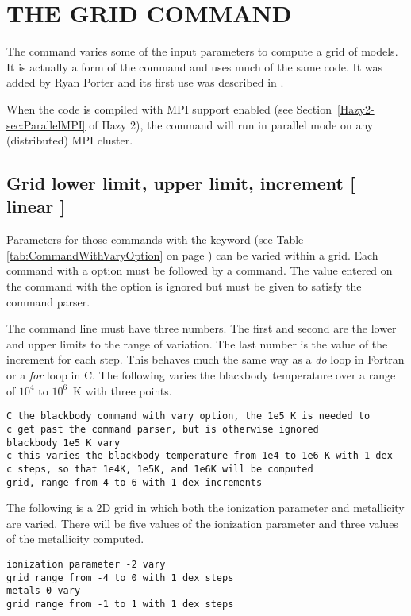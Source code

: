 \chapter{THE GRID COMMAND}
\label{sec:CommandGrid}

The  command varies some of the input parameters
to compute a grid of models.
It is actually a form of the  command and uses much
of the same code.
It was added by Ryan Porter and its first use was
described in \citet{Porter2006}.

When the code is
compiled with MPI support enabled (see Section~\ref{Hazy2-sec:ParallelMPI} of Hazy 2),
the  command will run
in parallel mode on any (distributed) MPI cluster.

\section{Grid lower limit, upper limit, increment [ linear ]}

Parameters for those commands with the  keyword
(see Table \ref{tab:CommandWithVaryOption}
on page \pageref{tab:CommandWithVaryOption}) can be varied
within a grid.
Each
command with a  option must be followed by a  command.
The value
entered on the command with the  option is
ignored but must be given
to satisfy the command parser.

The  command line must have three numbers.
The first and second
are the lower and upper limits to the range of variation.
The last number
is the value of the increment for each step.
This behaves much the same
way as a \emph{do} loop in Fortran or a \emph{for} loop in C.
The following varies the
blackbody temperature over a range of $10^4$ to $10^6$~K with three points.
\begin{verbatim}
C the blackbody command with vary option, the 1e5 K is needed to
c get past the command parser, but is otherwise ignored
blackbody 1e5 K vary
c this varies the blackbody temperature from 1e4 to 1e6 K with 1 dex
c steps, so that 1e4K, 1e5K, and 1e6K will be computed
grid, range from 4 to 6 with 1 dex increments
\end{verbatim}
The following is a 2D grid in which both the ionization parameter and
metallicity are varied.
There will be five values of the ionization
parameter and three values of the metallicity computed.
\begin{verbatim}
ionization parameter -2 vary
grid range from -4 to 0 with 1 dex steps
metals 0 vary
grid range from -1 to 1 with 1 dex steps
\end{verbatim}

